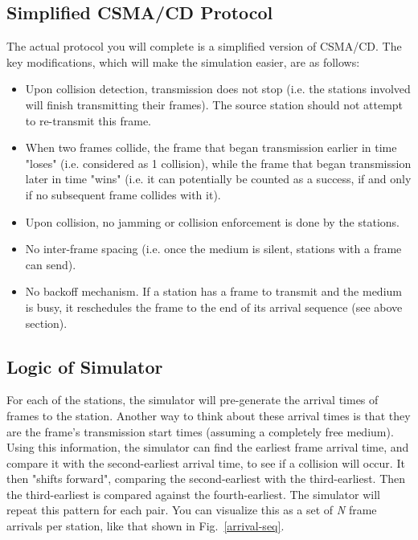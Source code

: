 \documentclass[11pt]{article}
\begin{document}
\subsection{Simplified CSMA/CD Protocol}
\label{subsec:simplified-csma-cd}
The actual protocol you will complete is a simplified version of CSMA/CD.
The key modifications, which will make the simulation easier, are as follows:
\begin{itemize}
    \item Upon collision detection, transmission does not stop (i.e. the stations involved will finish transmitting their frames). The source station should not attempt to re-transmit this frame.
    \item When two frames collide, the frame that began transmission earlier in time "loses" (i.e. considered as 1 collision), while the frame that began transmission later in time "wins" (i.e. it can potentially be counted as a success, if and only if no subsequent frame collides with it).
    \item Upon collision, no jamming or collision enforcement is done by the stations.
    \item No inter-frame spacing (i.e. once the medium is silent, stations with a frame can send).
    \item No backoff mechanism. If a station has a frame to transmit and the medium is busy, it reschedules the frame to the end of its arrival sequence (see above section).
\end{itemize}

\subsection{Logic of Simulator}
\label{subsec:logic}
For each of the stations, the simulator will pre-generate the arrival times of frames to the station.
Another way to think about these arrival times is that they are the frame's transmission start times (assuming a completely free medium).
Using this information, the simulator can find the earliest frame arrival time, and compare it with the second-earliest arrival time, to see if a collision will occur.
It then "shifts forward", comparing the second-earliest with the third-earliest.
Then the third-earliest is compared against the fourth-earliest.
The simulator will repeat this pattern for each pair.
You can visualize this as a set of \textit{N} frame arrivals per station, like that shown in Fig.~\ref{arrival-seq}.
\end{document}
